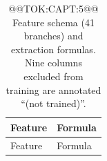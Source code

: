 \documentclass[11pt]{article}
\begin{document}
\small
\renewcommand{\arraystretch}{1.15}
\setlength{\LTleft}{0pt}
\setlength{\LTright}{0pt}
\setlength{\LTpre}{0pt plus 1pt minus 0pt}
\setlength{\LTpost}{0pt plus 1pt minus 0pt}
\begin{table}\begin{tabular}{@{}>{\raggedright\arraybackslash}p{}>{\raggedright\arraybackslash}p{}@{}}
\caption{@@TOK:CAPT:5@@ Feature schema (41 branches) and extraction formulas. Nine columns excluded from training are annotated ``(not trained)''.}\label{tab:feature-formulas}
\toprule
Feature & Formula \\
\midrule

\toprule
Feature & Formula \\
\midrule

\midrule


\bottomrule


\end{tabular}
\end{table}
\end{document}
